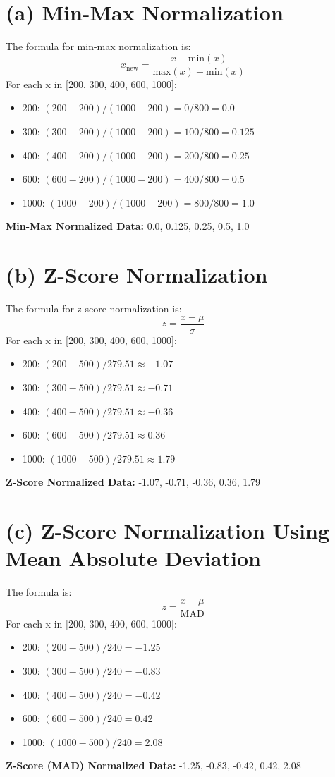 \documentclass{article}
\begin{document}
\section*{(a) Min-Max Normalization}
The formula for min-max normalization is:
\[
x_{\text{new}} = \frac{x - \text{min}(x)}{\text{max}(x) - \text{min}(x)}
\]
For each x in [200, 300, 400, 600, 1000]:
\begin{itemize}
  \item 200: $(200 - 200) / (1000 - 200) = 0 / 800 = 0.0$
  \item 300: $(300 - 200) / (1000 - 200) = 100 / 800 = 0.125$
  \item 400: $(400 - 200) / (1000 - 200) = 200 / 800 = 0.25$
  \item 600: $(600 - 200) / (1000 - 200) = 400 / 800 = 0.5$
  \item 1000: $(1000 - 200) / (1000 - 200) = 800 / 800 = 1.0$
\end{itemize}
\textbf{Min-Max Normalized Data:} 0.0, 0.125, 0.25, 0.5, 1.0

\section*{(b) Z-Score Normalization}
The formula for z-score normalization is:
\[
z = \frac{x - \mu}{\sigma}
\]
For each x in [200, 300, 400, 600, 1000]:
\begin{itemize}
  \item 200: $(200 - 500) / 279.51 \approx -1.07$
  \item 300: $(300 - 500) / 279.51 \approx -0.71$
  \item 400: $(400 - 500) / 279.51 \approx -0.36$
  \item 600: $(600 - 500) / 279.51 \approx 0.36$
  \item 1000: $(1000 - 500) / 279.51 \approx 1.79$
\end{itemize}
\textbf{Z-Score Normalized Data:} -1.07, -0.71, -0.36, 0.36, 1.79

\section*{(c) Z-Score Normalization Using Mean Absolute Deviation}
The formula is:
\[
z = \frac{x - \mu}{\text{MAD}}
\]
For each x in [200, 300, 400, 600, 1000]:
\begin{itemize}
  \item 200: $(200 - 500) / 240 = -1.25$
  \item 300: $(300 - 500) / 240 = -0.83$
  \item 400: $(400 - 500) / 240 = -0.42$
  \item 600: $(600 - 500) / 240 = 0.42$
  \item 1000: $(1000 - 500) / 240 = 2.08$
\end{itemize}
\textbf{Z-Score (MAD) Normalized Data:} -1.25, -0.83, -0.42, 0.42, 2.08
\end{document}
